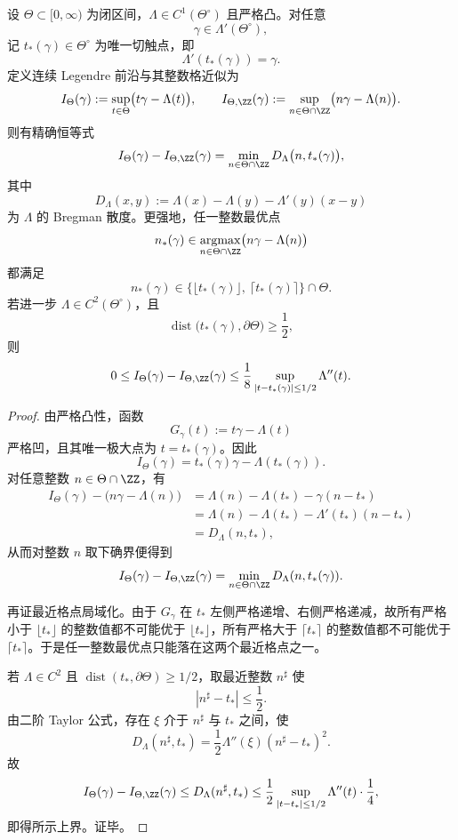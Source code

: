 \begin{theorem}\label{thm:conclusion-continuous-discrete-legendre-bregman-quantization}
设 \(\Theta\subset[0,\infty)\) 为闭区间，\(\Lambda\in C^1(\Theta^\circ)\) 且严格凸。对任意
\[
\gamma\in \Lambda'(\Theta^\circ),
\]
记 \(t_\ast(\gamma)\in\Theta^\circ\) 为唯一切触点，即
\[
\Lambda'(t_\ast(\gamma))=\gamma.
\]
定义连续 Legendre 前沿与其整数格近似为
\[
I_\Theta(\gamma):=\sup_{t\in\Theta}\bigl(t\gamma-\Lambda(t)\bigr),
\qquad
I_{\Theta,\ZZ}(\gamma):=\sup_{n\in\Theta\cap\ZZ}\bigl(n\gamma-\Lambda(n)\bigr).
\]
则有精确恒等式
\[
I_\Theta(\gamma)-I_{\Theta,\ZZ}(\gamma)
=
\min_{n\in\Theta\cap\ZZ}
D_\Lambda\bigl(n,t_\ast(\gamma)\bigr),
\]
其中
\[
D_\Lambda(x,y):=\Lambda(x)-\Lambda(y)-\Lambda'(y)(x-y)
\]
为 \(\Lambda\) 的 Bregman 散度。更强地，任一整数最优点
\[
n_\ast(\gamma)\in\operatorname*{argmax}_{n\in\Theta\cap\ZZ}\bigl(n\gamma-\Lambda(n)\bigr)
\]
都满足
\[
n_\ast(\gamma)\in
\{\lfloor t_\ast(\gamma)\rfloor,\ \lceil t_\ast(\gamma)\rceil\}\cap\Theta.
\]
若进一步 \(\Lambda\in C^2(\Theta^\circ)\)，且
\[
\operatorname{dist}\bigl(t_\ast(\gamma),\partial\Theta\bigr)\ge \frac12,
\]
则
\[
0\le I_\Theta(\gamma)-I_{\Theta,\ZZ}(\gamma)
\le
\frac18\sup_{|t-t_\ast(\gamma)|\le 1/2}\Lambda''(t).
\]
\end{theorem}
\begin{proof}
由严格凸性，函数
\[
G_\gamma(t):=t\gamma-\Lambda(t)
\]
严格凹，且其唯一极大点为 \(t=t_\ast(\gamma)\)。因此
\[
I_\Theta(\gamma)=t_\ast(\gamma)\gamma-\Lambda(t_\ast(\gamma)).
\]
对任意整数 \(n\in\Theta\cap\ZZ\)，有
\[
\begin{aligned}
I_\Theta(\gamma)-\bigl(n\gamma-\Lambda(n)\bigr)
&=
\Lambda(n)-\Lambda(t_\ast)-\gamma(n-t_\ast)\\
&=
\Lambda(n)-\Lambda(t_\ast)-\Lambda'(t_\ast)(n-t_\ast)\\
&=
D_\Lambda(n,t_\ast),
\end{aligned}
\]
从而对整数 \(n\) 取下确界便得到
\[
I_\Theta(\gamma)-I_{\Theta,\ZZ}(\gamma)
=
\min_{n\in\Theta\cap\ZZ}D_\Lambda(n,t_\ast(\gamma)).
\]

再证最近格点局域化。由于 \(G_\gamma\) 在 \(t_\ast\) 左侧严格递增、右侧严格递减，故所有严格小于 \(\lfloor t_\ast\rfloor\) 的整数值都不可能优于 \(\lfloor t_\ast\rfloor\)，所有严格大于 \(\lceil t_\ast\rceil\) 的整数值都不可能优于 \(\lceil t_\ast\rceil\)。于是任一整数最优点只能落在这两个最近格点之一。

若 \(\Lambda\in C^2\) 且 \(\operatorname{dist}(t_\ast,\partial\Theta)\ge 1/2\)，取最近整数 \(n^\sharp\) 使
\[
|n^\sharp-t_\ast|\le \frac12.
\]
由二阶 Taylor 公式，存在 \(\xi\) 介于 \(n^\sharp\) 与 \(t_\ast\) 之间，使
\[
D_\Lambda(n^\sharp,t_\ast)=\frac12\Lambda''(\xi)(n^\sharp-t_\ast)^2.
\]
故
\[
I_\Theta(\gamma)-I_{\Theta,\ZZ}(\gamma)
\le
D_\Lambda(n^\sharp,t_\ast)
\le
\frac12\sup_{|t-t_\ast|\le 1/2}\Lambda''(t)\cdot \frac14,
\]
即得所示上界。证毕。
\end{proof}

